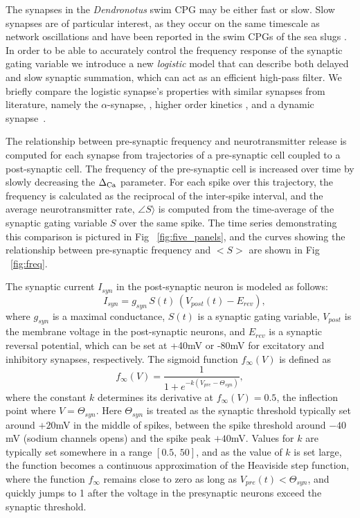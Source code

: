 \documentclass[nofootinbib,aip,amsmath,amssymb,reprint,twocolumn,10pt]{revtex4-2}
\begin{document}
The synapses in the \textit{Dendronotus} swim CPG may be either fast or slow. Slow synapses are of particular interest, as they occur on the same timescale as network oscillations and have been reported in the swim CPGs of the sea slugs \cite{NW02, WNT02, TW05, SNLK11}. In order to be able to accurately control the frequency response of the synaptic gating variable we introduce a new {\em logistic} model that can describe both delayed and slow synaptic summation, which can act as an efficient high-pass filter. We briefly compare the logistic synapse's properties with similar synapses from literature, namely the $\alpha$-synapse, \cite{Wang-Rinzel-92, Rall67}, higher order kinetics \cite{destexhe1998kinetic,DESTEXHE-CONTRERAS-SEJNOWSKI-STERIADE-94, Golomb96}, and a dynamic synapse~\cite{Hill2001}.


The relationship between pre-synaptic frequency and neurotransmitter release is computed for each synapse from trajectories of a pre-synaptic cell coupled to a post-synaptic cell. The frequency of the pre-synaptic cell is increased over time by slowly decreasing the $\Delta_{\rm{Ca}}$ parameter. For each spike over this trajectory, the frequency is calculated as the reciprocal of the inter-spike interval, and the average neurotransmitter rate, $\angle S \rangle$ is computed from the time-average of the synaptic gating variable $S$ over the same spike. The time series demonstrating this comparison is pictured in Fig ~\ref{fig:five_panels}, and the curves showing the relationship between pre-synaptic frequency and $<S>$ are shown in Fig ~\ref{fig:freq}.

The synaptic current $I_{syn}$ in the post-synaptic neuron is modeled as follows:  
\begin{equation}
\quad I_{syn} = g_{syn}\, S(t) \, (V_{post}(t)-E_{rev}), \label{Eqsyn}
\end{equation}
where $g_{syn}$ is a maximal conductance, $S(t) $ is a synaptic gating variable, $V_{post}$ is the membrane voltage in the post-synaptic neurons, and $E_{rev}$ is a synaptic reversal potential, which can be set at +40mV or -80mV for excitatory and inhibitory synapses, respectively. The sigmoid  function $f_{\infty}(V)$ is defined as
\begin{equation}
f_{\infty}(V) = \frac{1}{1+e^{-k(V_{pre}-\Theta_{syn})}},  \label{finf}
\end{equation}
where the constant $k$ determines its derivative at $f_{\infty}(V) = 0.5$, the inflection point where $V=\Theta_{syn}$. Here $\Theta_{syn}$ is treated as the synaptic threshold typically set around $+20$mV in the middle of spikes, between the spike threshold around $-40$mV (sodium channels opens) and the spike peak $+40$mV. Values for $k$ are typically set somewhere in a range $\left[0.5,\, 50\right]$, and as the value of $k$ is set large,  the function becomes a continuous approximation of the Heaviside step function, where the function $f_\infty$ remains close to zero as long as $V_{pre}(t) < \Theta_{syn}$, and quickly jumps to 1 after the voltage in the presynaptic neurons exceed the synaptic threshold.
\end{document}
